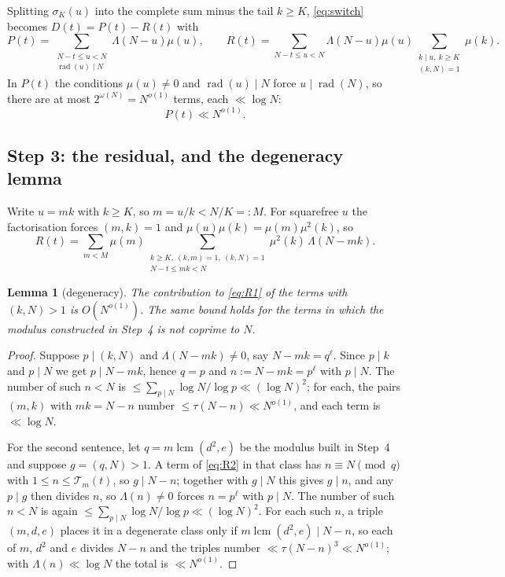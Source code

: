 \documentclass[11pt,a4paper]{article}
\theoremstyle{plain}
\newtheorem{lemma}[theorem]{Lemma}
\theoremstyle{definition}
\theoremstyle{remark}
\newcommand{\Tcut}{\mathcal T}
\DeclareMathOperator{\rad}{rad}
\DeclareMathOperator{\lcm}{lcm}
\begin{document}
Splitting $\sigma_K(u)$ into the complete sum minus the tail $k\ge K$,
\eqref{eq:switch} becomes $D(t)=P(t)-R(t)$ with
\begin{equation}\label{eq:PR}
  P(t)=\!\!\sum_{\substack{N-t\le u<N\\ \rad(u)\mid N}}\!\!\Lambda(N-u)\mu(u),
  \qquad
  R(t)=\!\!\sum_{N-t\le u<N}\!\!\Lambda(N-u)\mu(u)
       \sum_{\substack{k\mid u,\ k\ge K\\ (k,N)=1}}\mu(k).
\end{equation}
In $P(t)$ the conditions $\mu(u)\ne0$ and $\rad(u)\mid N$ force
$u\mid\rad(N)$, so there are at most $2^{\omega(N)}=N^{o(1)}$ terms,
each $\ll\log N$:
\begin{equation}\label{eq:P}
  P(t)\ll N^{o(1)}.
\end{equation}

\subsection{Step 3: the residual, and the degeneracy lemma}

Write $u=mk$ with $k\ge K$, so $m=u/k<N/K=:M$. For squarefree $u$ the
factorisation forces $(m,k)=1$ and $\mu(u)\mu(k)=\mu(m)\mu^2(k)$, so
\begin{equation}\label{eq:R1}
  R(t)=\sum_{m<M}\mu(m)
      \sum_{\substack{k\ge K,\ (k,m)=1,\ (k,N)=1\\ N-t\le mk<N}}
      \mu^2(k)\,\Lambda(N-mk).
\end{equation}

\begin{lemma}[degeneracy]\label{lem:degen}
The contribution to \eqref{eq:R1} of the terms with $(k,N)>1$ is
$O(N^{o(1)})$. The same bound holds for the terms in which the modulus
constructed in Step~4 is not coprime to $N$.
\end{lemma}

\begin{proof}
Suppose $p\mid(k,N)$ and $\Lambda(N-mk)\ne0$, say $N-mk=q^\ell$. Since
$p\mid k$ and $p\mid N$ we get $p\mid N-mk$, hence $q=p$ and
$n:=N-mk=p^\ell$ with $p\mid N$. The number of such $n<N$ is
$\le\sum_{p\mid N}\log N/\log p\ll(\log N)^2$; for each, the pairs
$(m,k)$ with $mk=N-n$ number $\le\tau(N-n)\ll N^{o(1)}$, and each term
is $\ll\log N$.

For the second sentence, let $q=m\lcm(d^2,e)$ be the modulus built in
Step~4 and suppose $g=(q,N)>1$. A term of \eqref{eq:R2} in that class
has $n\equiv N\pmod q$ with $1\le n\le\Tcut_m(t)$, so $g\mid N-n$;
together with $g\mid N$ this gives $g\mid n$, and any $p\mid g$ then
divides $n$, so $\Lambda(n)\ne0$ forces $n=p^\ell$ with $p\mid N$. The
number of such $n<N$ is again $\le\sum_{p\mid N}\log N/\log p
\ll(\log N)^2$. For each such $n$, a triple $(m,d,e)$ places it in a
degenerate class only if $m\lcm(d^2,e)\mid N-n$, so each of $m$, $d^2$
and $e$ divides $N-n$ and the triples number
$\ll\tau(N-n)^3\ll N^{o(1)}$; with $\Lambda(n)\ll\log N$ the total is
$\ll N^{o(1)}$.
\end{proof}
\end{document}

